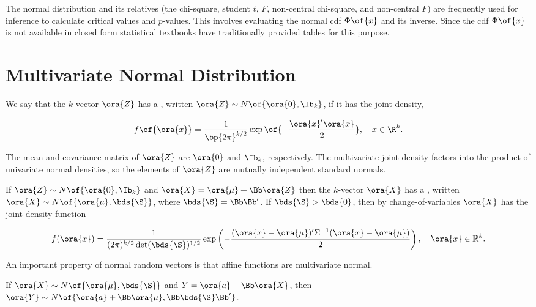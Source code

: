 The normal distribution and its relatives (the chi-square, student $t$, $F$, non-central chi-square, and non-central $F$) are frequently used for inference to calculate critical values and $p$-values. This involves evaluating the normal cdf $\Phi\of{x}$ and its inverse. Since the cdf $\Phi\of{x}$ is not available in closed form statistical textbooks have traditionally provided tables for this purpose.


\section{Multivariate Normal Distribution}

We say that the $k$-vector $\ora{Z}$ has a , written $\ora{Z} \sim N\of{\ora{0}, \Ib_k}$, if it has the joint density, 

\begin{equation}
    \notag
    f\of{\ora{x}} = \frac{1}{\bp{2\pi}^{k/2}} \exp\of{-\frac{\ora{x}^\prime \ora{x}}{2}}, \quad x \in \R^k.
\end{equation}

The mean and covariance matrix of $\ora{Z}$ are $\ora{0}$ and $\Ib_k$, respectively. The multivariate joint density factors into the product of univariate normal densities, so the elements of $\ora{Z}$ are mutually independent standard normals.

If $\ora{Z} \sim N\of{\ora{0}, \Ib_k}$ and $\ora{X} = \ora{\mu} + \Bb \ora{Z}$ then the $k$-vector $\ora{X}$ has a , written $\ora{X} \sim N\of{\ora{\mu}, \bds{\S}}$, where $\bds{\S} = \Bb \Bb^\prime$. If $\bds{\S} > \bds{0}$, then by change-of-variables $\ora{X}$ has the joint density function

\begin{equation}
    \notag
    f(\ora{x})=\frac{1}{(2 \pi)^{k / 2} \operatorname{det}(\bds{\S})^{1 / 2}} \exp \left(-\frac{(\ora{x}-\ora{\mu})^{\prime} \Sigma^{-1}(\ora{x}-\ora{\mu})}{2}\right), \quad \ora{x} \in \mathbb{R}^k .
\end{equation}

An important property of normal random vectors is that affine functions are multivariate normal.

\begin{theorem}
    \label{Hansen_thm_5_2}
    If $\ora{X} \sim N\of{\ora{\mu}, \bds{\S}}$ and $Y = \ora{a} + \Bb \ora{X}$, then $\ora{Y} \sim N\of{\ora{a} + \Bb\ora{\mu}, \Bb\bds{\S}\Bb^\prime}$.
\end{theorem}

